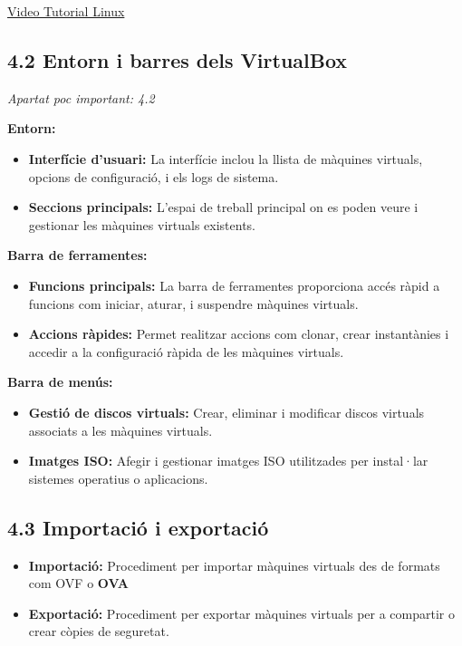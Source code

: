 \documentclass[
  spanish,
  12 pt,
  a4paper,
]{article}
\providecommand{\tightlist}{%
  \setlength{\itemsep}{0pt}\setlength{\parskip}{0pt}}
\begin{document}
\href{https://www.youtube.com/watch?v=qH9JuCjCKow}{Video Tutorial Linux}

\subsection{4.2 Entorn i barres dels
VirtualBox}\label{entorn-i-barres-dels-virtualbox}

\emph{Apartat poc important: 4.2}

\textbf{Entorn:}

\begin{itemize}
\tightlist
\item
  \textbf{Interfície d'usuari:} La interfície inclou la llista de
  màquines virtuals, opcions de configuració, i els logs de sistema.
\item
  \textbf{Seccions principals:} L'espai de treball principal on es poden
  veure i gestionar les màquines virtuals existents.
\end{itemize}

\textbf{Barra de ferramentes:}

\begin{itemize}
\tightlist
\item
  \textbf{Funcions principals:} La barra de ferramentes proporciona
  accés ràpid a funcions com iniciar, aturar, i suspendre màquines
  virtuals.
\item
  \textbf{Accions ràpides:} Permet realitzar accions com clonar, crear
  instantànies i accedir a la configuració ràpida de les màquines
  virtuals.
\end{itemize}

\textbf{Barra de menús:}

\begin{itemize}
\tightlist
\item
  \textbf{Gestió de discos virtuals:} Crear, eliminar i modificar discos
  virtuals associats a les màquines virtuals.
\item
  \textbf{Imatges ISO:} Afegir i gestionar imatges ISO utilitzades per
  instal·lar sistemes operatius o aplicacions.
\end{itemize}

\subsection{4.3 Importació i
exportació}\label{importaciuxf3-i-exportaciuxf3}

\begin{itemize}
\tightlist
\item
  \textbf{Importació:} Procediment per importar màquines virtuals des de
  formats com OVF o \textbf{OVA}
\item
  \textbf{Exportació:} Procediment per exportar màquines virtuals per a
  compartir o crear còpies de seguretat.
\end{itemize}
\end{document}
